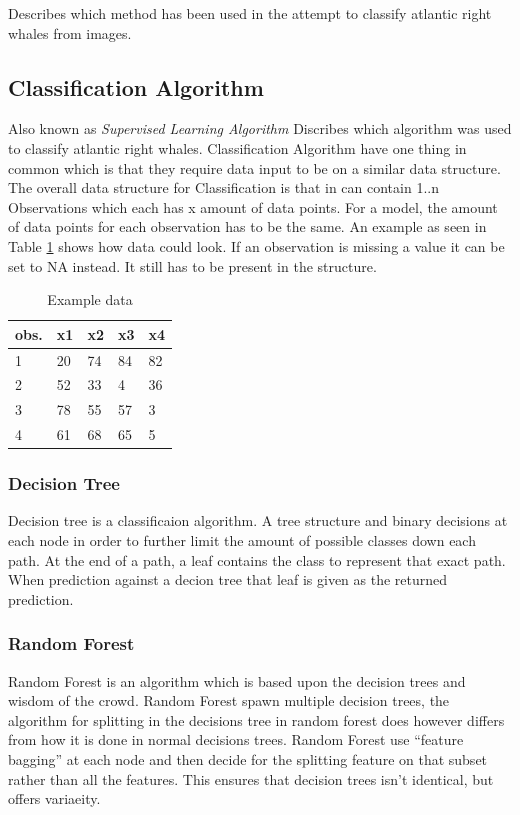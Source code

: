 Describes which method has been used in the attempt to classify atlantic right whales from images.

\subsection{Classification Algorithm}
Also known as \emph{Supervised Learning Algorithm}
Discribes which algorithm was used to classify atlantic right whales. Classification Algorithm have one thing in common which is that they require data input to be on a similar data structure.
The overall data structure for Classification is that in can contain 1..n Observations which each has x amount of data points. For a model, the amount of data points for each observation has to be the same. An example as seen in Table \ref{tab:example data} shows how data could look.
If an observation is missing a value it can be set to NA instead. It still has to be present in the structure.

\begin{table}
  \centering
  \caption{Example data}
  \label{tab:example data}
  \begin{tabularx}{\linewidth}{|l|X|X|X|X|} \hline
    obs. & x1 & x2 & x3 & x4 \\ \hline
    1    & 20 & 74 & 84 & 82 \\ \hline
    2    & 52 & 33 & 4  & 36 \\ \hline
    3    & 78 & 55 & 57 & 3  \\ \hline
    4    & 61 & 68 & 65 & 5  \\ \hline
  \end{tabularx}
\end{table}

\subsubsection{Decision Tree}
Decision tree is a classificaion algorithm. A tree structure and binary decisions at each node in order to further limit the amount of possible classes down each path.
At the end of a path, a leaf contains the class to represent that exact path.
When prediction against a decion tree that leaf is given as the returned prediction.

\subsubsection{Random Forest}
Random Forest is an algorithm which is based upon the decision trees and wisdom of the crowd.
Random Forest spawn multiple decision trees, the algorithm for splitting in the decisions tree in random forest does however differs from how it is done in normal decisions trees.
Random Forest use ``feature bagging'' at each node and then decide for the splitting feature on that subset rather than all the features. This ensures that decision trees isn't identical, but offers variaeity.

